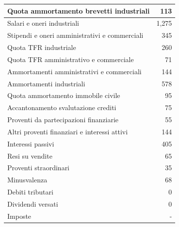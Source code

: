 \documentclass{article}
\begin{document}
\begin{longtable}{|l|r|}
    \hline
    Quota ammortamento brevetti industriali                & 113                  \\
    \hline
    Salari e oneri industriali                             & 1,275                \\
    \hline
    Stipendi e oneri amministrativi e commerciali          & 345                  \\
    \hline
    Quota TFR industriale                                  & 260                  \\
    \hline
    Quota TFR amministrativo e commerciale                 & 71                   \\
    \hline
    Ammortamenti amministrativi e commerciali              & 144                  \\
    \hline
    Ammortamenti industriali                               & 578                  \\
    \hline
    Quota ammortamento immobile civile                     & 95                   \\
    \hline
    Accantonamento svalutazione crediti                    & 75                   \\
    \hline
    Proventi da partecipazioni finanziarie                 & 55                   \\
    \hline
    Altri proventi finanziari e interessi attivi           & 144                  \\
    \hline
    Interessi passivi                                      & 405                  \\
    \hline
    Resi su vendite                                        & 65                   \\
    \hline
    Proventi straordinari                                  & 35                   \\
    \hline
    Minusvalenza                                           & 68                   \\
    \hline
    \endhead
    Debiti tributari                                       & 0                    \\
    \hline
    Dividendi versati                                      & 0                    \\
    \hline
    Imposte                                                & -                    \\
    \hline
\end{longtable}
\label{tab:bilancio}
\end{document}
